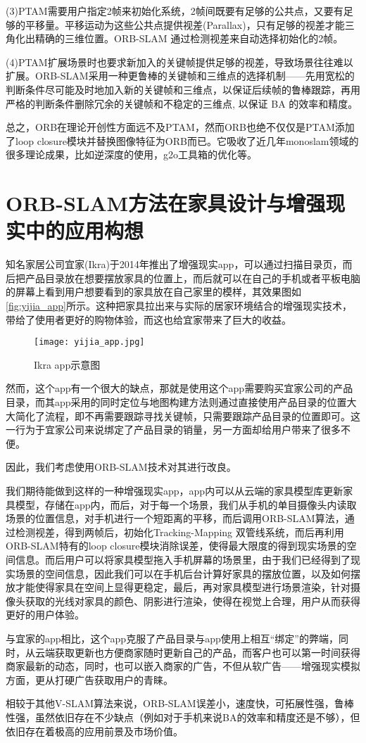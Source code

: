 (3)PTAM需要用户指定2帧来初始化系统，2帧间既要有足够的公共点，又要有足够的平移量。平移运动为这些公共点提供视差(Parallax)，只有足够的视差才能三角化出精确的三维位置。ORB-SLAM 通过检测视差来自动选择初始化的2帧。

(4)PTAM扩展场景时也要求新加入的关键帧提供足够的视差，导致场景往往难以扩展。ORB-SLAM采用一种更鲁棒的关键帧和三维点的选择机制——先用宽松的判断条件尽可能及时地加入新的关键帧和三维点，以保证后续帧的鲁棒跟踪，再用严格的判断条件删除冗余的关键帧和不稳定的三维点, 以保证 BA 的效率和精度。

总之，ORB在理论开创性方面远不及PTAM，然而ORB也绝不仅仅是PTAM添加了loop closure模块并替换图像特征为ORB而已。它吸收了近几年monoslam领域的很多理论成果，比如逆深度的使用，g2o工具箱的优化等。
\section{ORB-SLAM方法在家具设计与增强现实中的应用构想}
知名家居公司宜家(Ikra)于2014年推出了增强现实app，可以通过扫描目录页，而后把产品目录放在想要摆放家具的位置上，而后就可以在自己的手机或者平板电脑的屏幕上看到用户想要看到的家具放在自己家里的模样，其效果图如\autoref*{fig:yijia_app}所示。这种把家具拉出来与实际的居家环境结合的增强现实技术，带给了使用者更好的购物体验，而这也给宜家带来了巨大的收益。

\begin{figure}[!htbp]
\centering
\texttt{[image: yijia\_app.jpg]}
\caption{Ikra app示意图}
\label{fig:yijia_app}
\end{figure}

然而，这个app有一个很大的缺点，那就是使用这个app需要购买宜家公司的产品目录，而其app采用的同时定位与地图构建方法则通过直接使用产品目录的位置大大简化了流程，即不再需要跟踪寻找关键帧，只需要跟踪产品目录的位置即可。这一行为于宜家公司来说绑定了产品目录的销量，另一方面却给用户带来了很多不便。

因此，我们考虑使用ORB-SLAM技术对其进行改良。

我们期待能做到这样的一种增强现实app，app内可以从云端的家具模型库更新家具模型，存储在app内，而后，对于每一个场景，我们从手机的单目摄像头内读取场景的位置信息，对手机进行一个短距离的平移，而后调用ORB-SLAM算法，通过检测视差，得到两帧后，初始化Tracking-Mapping 双管线系统，而后再利用ORB-SLAM特有的loop closure模块消除误差，使得最大限度的得到现实场景的空间信息。而后用户可以将家具模型拖入手机屏幕的场景里，由于我们已经得到了现实场景的空间信息，因此我们可以在手机后台计算好家具的摆放位置，以及如何摆放才能使得家具在空间上显得更稳定，最后，再对家具模型进行场景渲染，针对摄像头获取的光线对家具的颜色、阴影进行渲染，使得在视觉上合理，用户从而获得更好的用户体验。

与宜家的app相比，这个app克服了产品目录与app使用上相互“绑定”的弊端，同时，从云端获取更新也方便商家随时更新自己的产品，而客户也可以第一时间获得商家最新的动态，同时，也可以嵌入商家的广告，不但从软广告——增强现实模拟方面，更从打硬广告获取用户的青睐。

相较于其他V-SLAM算法来说，ORB-SLAM误差小，速度快，可拓展性强，鲁棒性强，虽然依旧存在不少缺点（例如对于手机来说BA的效率和精度还是不够），但依旧存在着极高的应用前景及市场价值。

